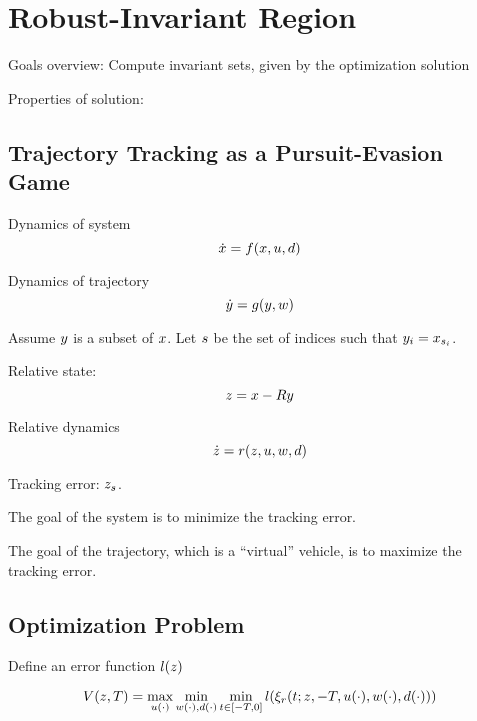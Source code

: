 \section{Robust-Invariant Region \label{sec:reachability}}
Goals overview: Compute invariant sets, given by the optimization solution

Properties of solution: 

\subsection{Trajectory Tracking as a Pursuit-Evasion Game}
Dynamics of system
\begin{equation}
\dot{x} = f(x, u, d)
\end{equation}

Dynamics of trajectory
\begin{equation}
\dot{y} = g(y, w)
\end{equation}

Assume $y$ is a subset of $x$. Let $s$ be the set of indices such that $y_i = x_{s_i}$.

Relative state:
\begin{equation}
z = x - Ry
\end{equation}

Relative dynamics
\begin{equation}
\dot{z} = r(z, u, w, d)
\end{equation}

Tracking error: $z_{s}$.

The goal of the system is to minimize the tracking error.

The goal of the trajectory, which is a ``virtual'' vehicle, is to maximize the tracking error.

\subsection{Optimization Problem}
Define an error function $l(z)$

\begin{equation}
V(z, T) = \max_{u(\cdot)} \min_{w(\cdot), d(\cdot)} \min_{t \in [-T, 0]} l(\xi_r(t; z, -T, u(\cdot), w(\cdot), d(\cdot))) 
\end{equation}

